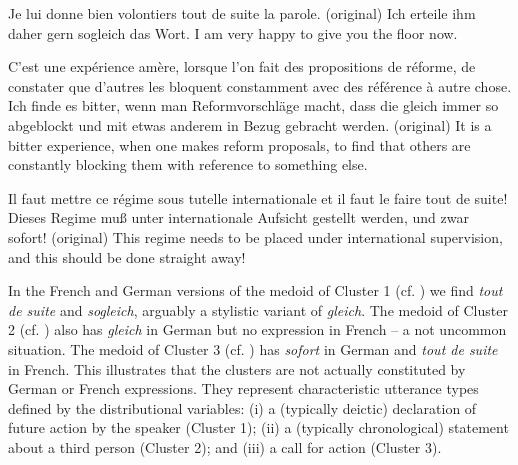 \begin{exe}
  \ex\label{ClusterEx1}
  \begin{xlist}
    \ex Je lui donne bien volontiers tout de suite la parole. (original)
    \ex Ich erteile ihm daher gern sogleich das Wort.
    \ex I am very happy to give you the floor now.
  \end{xlist}
  \ex\label{ClusterEx2}
  \begin{xlist}
    \ex C'est une expérience amère, lorsque l'on fait des propositions
    de réforme, de constater que d'autres les bloquent constamment
    avec des référence à autre chose.
    \ex Ich finde es bitter, wenn
    man Reformvorschläge macht, dass die gleich immer so abgeblockt
    und mit etwas anderem in Bezug gebracht werden. (original)
    \ex It is a bitter experience, when one makes reform proposals, to find
    that others are constantly blocking them with reference to
    something else.
  \end{xlist}
  \ex\label{ClusterEx3}
  \begin{xlist}
    \ex Il faut mettre ce régime sous tutelle internationale et il faut le faire tout de suite!
    \ex Dieses Regime muß unter internationale Aufsicht gestellt werden, und zwar sofort! (original)
    \ex This regime needs to be placed under international supervision, and this should be done straight away! 
  \end{xlist}
\end{exe}
%
In the French and German versions of the medoid of Cluster 1
(cf. ) we find \textit{tout de suite} and
\textit{sogleich}, arguably a stylistic variant of
\textit{gleich}. The medoid of Cluster 2 (cf. ) also
has \textit{gleich} in German but no expression in French -- a not
uncommon situation. The medoid of Cluster 3 (cf. ) has
\textit{sofort} in German and \textit{tout de suite} in French. This
illustrates that the clusters are not actually constituted by German
or French expressions. They represent characteristic utterance types
defined by the distributional variables: (i) a (typically deictic)
declaration of future action by the speaker (Cluster 1); (ii) a
(typically chronological) statement about a third person (Cluster 2);
and (iii) a call for action (Cluster 3).

